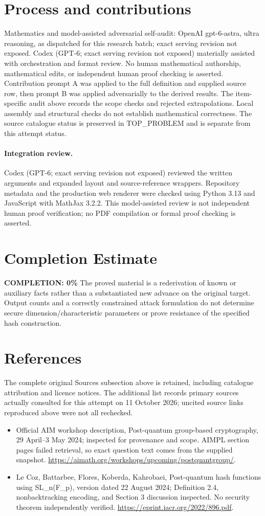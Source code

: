 \documentclass[11pt]{article}
\begin{document}
\section{Process and contributions}
Mathematics and model-assisted adversarial self-audit: OpenAI gpt-6-astra, ultra reasoning, as dispatched for this research batch; exact serving revision not exposed. Codex (GPT-6; exact serving revision not exposed) materially assisted with orchestration and format review. No human mathematical authorship, mathematical edits, or independent human proof checking is asserted.
Contribution prompt A was applied to the full definition and supplied source row, then prompt B was applied adversarially to the derived results. The item-specific audit above records the scope checks and rejected extrapolations. Local assembly and structural checks do not establish mathematical correctness. The source catalogue status is preserved in TOP\_PROBLEM and is separate from this attempt status.
\paragraph{Integration review.} Codex (GPT-6; exact serving revision not exposed) reviewed the written arguments and expanded layout and source-reference wrappers. Repository metadata and the production web renderer were checked using Python 3.13 and JavaScript with MathJax 3.2.2. This model-assisted review is not independent human proof verification; no PDF compilation or formal proof checking is asserted.

\section{Completion Estimate}
\noindent\textbf{COMPLETION: 0\%}
The proved material is a rederivation of known or auxiliary facts rather than a substantiated new advance on the original target. Output counts and a correctly constrained attack formulation do not determine secure dimension/characteristic parameters or prove resistance of the specified hash construction.
\section{References}
The complete original Sources subsection above is retained, including catalogue attribution and licence notices. The additional list records primary sources actually consulted for this attempt on 11 October 2026; uncited source links reproduced above were not all rechecked.
\begin{itemize}
\item Official AIM workshop description, Post-quantum group-based cryptography, 29 April--3 May 2024; inspected for provenance and scope. AIMPL section pages failed retrieval, so exact question text comes from the supplied snapshot. \url{https://aimath.org/workshops/upcoming/postquantgroup/}.
\item Le Coz, Battarbee, Flores, Koberda, Kahrobaei, Post-quantum hash functions using SL_n(F_p), version dated 22 August 2024; Definition 2.4, nonbacktracking encoding, and Section 3 discussion inspected. No security theorem independently verified. \url{https://eprint.iacr.org/2022/896.pdf}.
\end{itemize}
\end{document}
